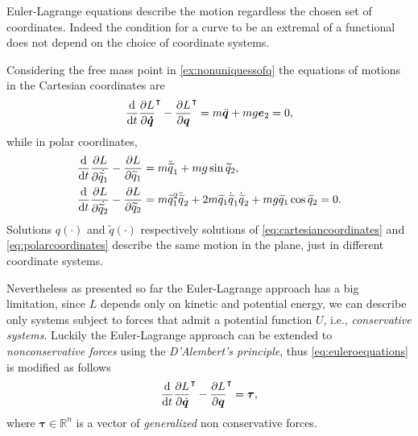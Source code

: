 		Euler-Lagrange equations describe the motion regardless the chosen set of coordinates.
		Indeed the condition for a curve to be an extremal of a functional does
		not depend on the choice of coordinate systems.
		\begin{example}
			Considering the free mass point in \cref{ex:nonuniquessofq}
			the equations of motions in the Cartesian coordinates are
			\begin{equation}
				\label{eq:cartesiancoordinates}
				\frac{\mathop{}\!\mathrm{d}}{\mathop{}\!\mathrm{d} t}
				\frac{\partial L}{\partial\bm{\dot{q}}}^{\intercal} 
				- \frac{\partial L}{\partial\bm{q}}^{\intercal} = m\ddot{\bm{q}} + mg\bm{e}_{2} = 0,
			\end{equation}
			while in polar coordinates,
			\begin{subequations}
				\begin{align}
					\frac{\mathop{}\!\mathrm{d}}{\mathop{}\!\mathrm{d} t}\frac{\partial L}{\partial\dot{\widetilde{q}_{1}}} 
					- \frac{\partial L}{\partial\widetilde{q}_{1}} 
					&= m\ddot{\widetilde{q}}_{1} +  mg\sin{\widetilde{q}_{2}}, \\
					\frac{\mathop{}\!\mathrm{d}}{\mathop{}\!\mathrm{d} t}\frac{\partial L}{\partial\dot{\widetilde{q}_{2}}} 
					- \frac{\partial L}{\partial\widetilde{q}_{2}}
					&= m\widetilde{q}_{1}^{2}\ddot{\widetilde{q}}_{2} +
					2m\widetilde{q}_{1}\dot{\widetilde{q}}_{1}\dot{\widetilde{q}}_{2}
					+ mg\widetilde{q}_{1}\cos{\widetilde{q}_{2}} = 0.
				\end{align}
				\label{eq:polarcoordinates}
			\end{subequations}
			Solutions $q(\cdot)$ and $\widetilde{q}(\cdot)$ respectively solutions 
			of \cref{eq:cartesiancoordinates} and \cref{eq:polarcoordinates} describe
			the same motion in the plane, just in different coordinate systems.
		\end{example} 
		Nevertheless as presented so far the Euler-Lagrange approach has a big limitation,
		since $L$ depends only on kinetic and potential energy, we can describe only systems
		subject to forces that admit a potential function $U$, i.e., \emph{conservative systems}.
		Luckily the Euler-Lagrange approach can be extended to \emph{nonconservative forces}
		using the \emph{D'Alembert's principle}, thus \cref{eq:euleroequations} is modified as follows
		\begin{equation}
			\frac{\mathop{}\!\mathrm{d}}{\mathop{}\!\mathrm{d} t}\frac{\partial L}{\partial\dot{\bm{q}}}^{\intercal}
			-\frac{\partial L}{\partial \bm{q}}^{\intercal} = \bm{\tau},
		\end{equation}
		where $\bm{\tau}\in\mathbb{R}^{n}$ is a vector of \emph{generalized} non conservative forces.
		
